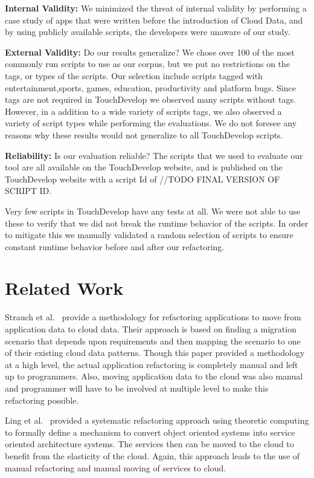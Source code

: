 \documentclass{sigplanconf}
\begin{document}
\textbf{Internal Validity:}  We minimized the threat of internal validity by performing a case study of apps that were written before the introduction of Cloud Data, and by using publicly available scripts, the developers were unaware of our study.  

\textbf{External Validity:}  Do our results generalize? We chose over 100 of the most commonly run scripts to use as our corpus, but we put no restrictions on the tags, or types of the scripts.  Our selection include scripts tagged with entertainment,sports, games, education, productivity and platform bugs.  Since tags are not required in TouchDevelop we observed many scripts without tags.  However, in a addition to a wide variety of scripts tags, we also observed a variety of script types while performing the evaluations.  We do not foresee any reasons why these results would not generalize to all TouchDevelop scripts.

\textbf{Reliability:} Is our evaluation reliable? The scripts that we used to evaluate our tool are all available on the TouchDevelop website, and \tool is published on the TouchDevelop website with a script Id of //TODO FINAL VERSION OF SCRIPT ID.

Very few scripts in TouchDevelop have any tests at all.  We were not able to use these to verify that we did not break the runtime behavior of the scripts.  In order to mitigate this we manually validated a random selection of scripts to ensure constant runtime behavior before and after our refactoring.



\section{Related Work}
\label{sec:relatedWork}

Strauch et al.~\cite{strauchmigrating} provide a methodology for refactoring applications to move from application data to cloud data.  Their approach is based on finding a migration scenario that depends upon requirements and then mapping the scenario to one of their existing cloud data patterns. Though this paper provided a methodology at a high level, the actual application refactoring is completely manual and left up to programmers. Also, moving application data to the cloud was also manual  and programmer will have to be involved at multiple level to make this refactoring possible.  

Ling et al.~\cite{ling2010refactoring} provided a systematic refactoring approach using theoretic computing to formally define a mechanism to convert object oriented systems into service oriented architecture systems. The services then can be moved to the cloud to benefit from the elasticity of the cloud. Again, this approach leads to the use of manual refactoring and manual moving of services to cloud. 
\end{document}
